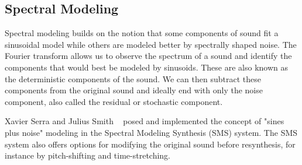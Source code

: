 \documentclass{acmsiggraph}               %
\begin{document}

\subsection{Spectral Modeling}

Spectral modeling builds on the notion that some components of sound fit a sinusoidal model 
while others are modeled better by spectrally shaped noise. The Fourier transform allows us to 
observe the spectrum of a sound and identify the components that would best be modeled by 
sinusoids. These are also known as the deterministic components of the sound. We can then 
subtract these components from the original sound and ideally end with only the noise 
component, also called the residual or stochastic component. 

Xavier Serra and Julius Smith ~ posed and implemented the concept of "sines 
plus noise" modeling in the Spectral Modeling Synthesis (SMS) system. The SMS system also 
offers options for modifying the original sound before resynthesis, for instance by 
pitch-shifting and time-stretching.
\end{document}
